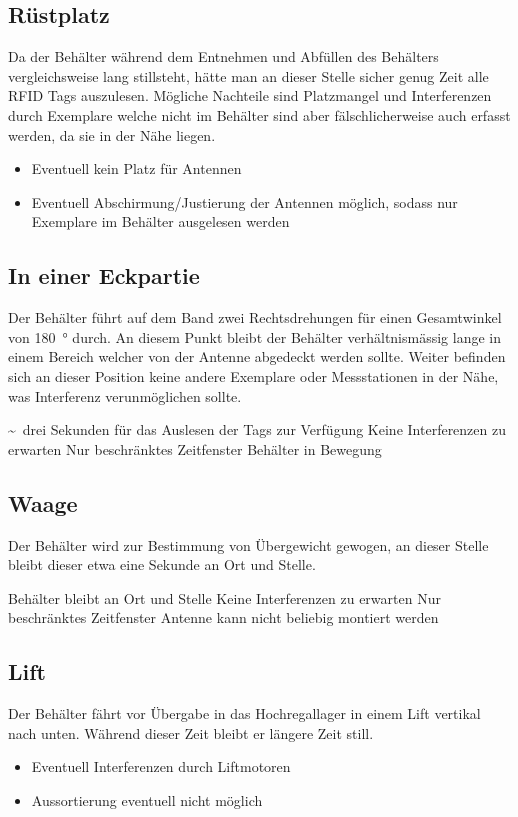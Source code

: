 \subsection{Rüstplatz}
Da der Behälter während dem Entnehmen und Abfüllen des Behälters vergleichsweise lang stillsteht, hätte man an dieser Stelle sicher genug Zeit alle RFID Tags auszulesen. Mögliche Nachteile sind Platzmangel und Interferenzen durch Exemplare welche nicht im Behälter sind aber fälschlicherweise auch erfasst werden, da sie in der Nähe liegen.
\begin{itemize}
	\pro Genügend Zeit für das Auslesen aller Tags
	\pro Früh im Prozess für eine Meldung
	\con Interferenzen durch RFID markierte Exemplare in der Nähe
	\item Eventuell kein Platz für Antennen
	\item Eventuell Abschirmung/Justierung der Antennen möglich, sodass nur Exemplare im Behälter ausgelesen werden
\end{itemize}

\subsection{In einer Eckpartie}
Der Behälter führt auf dem Band zwei Rechtsdrehungen für einen Gesamtwinkel von \SI{180}{\degree} durch. An diesem Punkt bleibt der Behälter verhältnismässig lange in einem Bereich welcher von der Antenne abgedeckt werden sollte. Weiter befinden sich an dieser Position keine andere Exemplare oder Messstationen in der Nähe, was Interferenz verunmöglichen sollte.
\begin{itemize}
	\pro \textasciitilde\ drei Sekunden für das Auslesen der Tags zur Verfügung
	\pro Keine Interferenzen zu erwarten
	\con Nur beschränktes Zeitfenster
	\con Behälter in Bewegung
\end{itemize}

\subsection{Waage}
Der Behälter wird zur Bestimmung von Übergewicht gewogen, an dieser Stelle bleibt dieser etwa eine Sekunde an Ort und Stelle.
\begin{itemize}
	\pro Behälter bleibt an Ort und Stelle
	\pro Keine Interferenzen zu erwarten
	\con Nur beschränktes Zeitfenster
	\con Antenne kann nicht beliebig montiert werden
\end{itemize}

\subsection{Lift}
Der Behälter fährt vor Übergabe in das Hochregallager in einem Lift vertikal nach unten. Während dieser Zeit bleibt er längere Zeit still.
\begin{itemize}
	\pro Behälter bleibt an Ort und Stelle
	\pro Grosses Zeitfenster
	\con Beschränkter Platz da Lift
	\con Spät im Prozess
	\item Eventuell Interferenzen durch Liftmotoren
	\item Aussortierung eventuell nicht möglich
\end{itemize}

